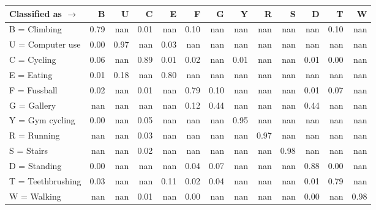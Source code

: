 \begin{tabular}{lrrrrrrrrrrrr}
\toprule
Classified as $\rightarrow$ &    B &    U &    C &    E &    F &    G &    Y &    R &    S &    D &    T &    W \\
\midrule
B = Climbing      & 0.79 &  nan & 0.01 &  nan & 0.10 &  nan &  nan &  nan &  nan &  nan & 0.10 &  nan \\
U = Computer use  & 0.00 & 0.97 &  nan & 0.03 &  nan &  nan &  nan &  nan &  nan &  nan &  nan &  nan \\
C = Cycling       & 0.06 &  nan & 0.89 & 0.01 & 0.02 &  nan & 0.01 &  nan &  nan & 0.01 & 0.00 &  nan \\
E = Eating        & 0.01 & 0.18 &  nan & 0.80 &  nan &  nan &  nan &  nan &  nan &  nan &  nan &  nan \\
F = Fussball      & 0.02 &  nan & 0.01 &  nan & 0.79 & 0.10 &  nan &  nan &  nan & 0.01 & 0.07 &  nan \\
G = Gallery       &  nan &  nan &  nan &  nan & 0.12 & 0.44 &  nan &  nan &  nan & 0.44 &  nan &  nan \\
Y = Gym cycling   & 0.00 &  nan & 0.05 &  nan &  nan &  nan & 0.95 &  nan &  nan &  nan &  nan &  nan \\
R = Running       &  nan &  nan & 0.03 &  nan &  nan &  nan &  nan & 0.97 &  nan &  nan &  nan &  nan \\
S = Stairs        &  nan &  nan & 0.02 &  nan &  nan &  nan &  nan &  nan & 0.98 &  nan &  nan &  nan \\
D = Standing      & 0.00 &  nan &  nan &  nan & 0.04 & 0.07 &  nan &  nan &  nan & 0.88 & 0.00 &  nan \\
T = Teethbrushing & 0.03 &  nan &  nan & 0.11 & 0.02 & 0.04 &  nan &  nan &  nan & 0.01 & 0.79 &  nan \\
W = Walking       &  nan &  nan & 0.01 &  nan & 0.00 &  nan &  nan &  nan &  nan & 0.00 &  nan & 0.98 \\
\bottomrule
\end{tabular}
